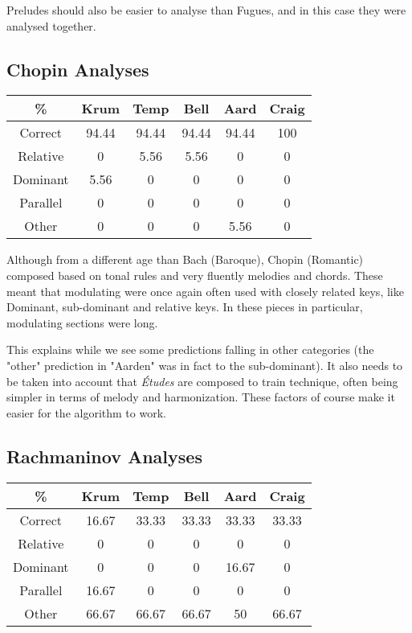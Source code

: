 Preludes should also be easier to analyse than Fugues, and in this case they were analysed together.

\subsection{Chopin Analyses} \label{sec:chopin}

\begin{center}
    \begin{tabular}{|c||c c c c c||} 
    \hline
    \% & Krum & Temp & Bell & Aard & Craig \\
    \hline\hline
    Correct & 94.44 & 94.44 & 94.44 & 94.44 & 100\\ 
    \hline
    Relative & 0 & 5.56 & 5.56 & 0 & 0\\
    \hline
    Dominant & 5.56 & 0 & 0 & 0 & 0\\
    \hline
    Parallel & 0 & 0 & 0 & 0 & 0\\
    \hline
    Other & 0 & 0 & 0 & 5.56 & 0\\
    \hline
   \end{tabular}
\end{center}

Although from a different age than Bach (Baroque), Chopin (Romantic) composed based on tonal rules and very fluently melodies and chords.
These meant that modulating were once again often used with closely related keys, like Dominant, sub-dominant and relative keys.
In these pieces in particular, modulating sections were long.

This explains while we see some predictions falling in other categories (the "other" prediction in "Aarden" was in fact to the sub-dominant).
It also needs to be taken into account that \textit{Études} are composed to train technique, often being simpler in terms of melody and harmonization.
These factors of course make it easier for the algorithm to work.


\subsection{Rachmaninov Analyses} \label{sec:rach}

\begin{center}
    \begin{tabular}{|c||c c c c c||} 
    \hline
    \% & Krum & Temp & Bell & Aard & Craig \\
    \hline\hline
    Correct & 16.67 & 33.33 & 33.33 & 33.33 & 33.33\\ 
    \hline
    Relative & 0 & 0 & 0 & 0 & 0\\
    \hline
    Dominant & 0 & 0 & 0 & 16.67 & 0\\
    \hline
    Parallel & 16.67 & 0 & 0 & 0 & 0\\
    \hline
    Other & 66.67 & 66.67 & 66.67 & 50 & 66.67\\
    \hline
   \end{tabular}
\end{center}

